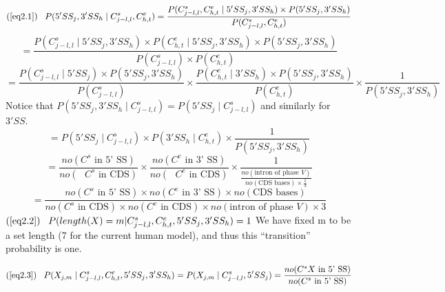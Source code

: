 $$
(\ref{eq2.1}) \;\;\; P(5'SS_j,3'SS_h \; |\;  C^s_{j-l,l},C^e_{h,t})
= \frac{P(C^s_{j-l,l},C^e_{h,t} \; |\;  5'SS_j,3'SS_h ) \times
P( 5'SS_j,3'SS_h)}{ P(C^s_{j-l,l},C^e_{h,t})}
$$
$$
= \frac{P(C^s_{j-l,l} \; |\;  5'SS_j,3'SS_h ) \times P(C^e_{h,t}\; |\; 5'SS_j,3'SS_h )\times P( 5'SS_j,3'SS_h)}
{ P(C^s_{j-l,l})\times P(C^e_{h,t})}
$$
$$
= \frac{P(C^s_{j-l,l} \; |\;  5'SS_j ) \times P( 5'SS_j,3'SS_h)} {P(C^s_{j-l,l})} \times
 \frac{ P(C^e_{h,t}\; |\; 3'SS_h )\times  P(5'SS_j,3'SS_h)}{P(C^e_{h,t})} \times
\frac{1}{ P(5'SS_j,3'SS_h)}
$$
Notice that $P(5'SS_j,3'SS_h \; |\; C^s_{j-l,l}) = P(5'SS_j \; |\; C^s_{j-l,l})$ and similarly for $3'SS$.
$$
= P( 5'SS_j \; |\;  C^s_{j-l,l}) \times  P(3'SS_h \; |\;  C^e_{h,t}) \times \frac{1}{ P(5'SS_j,3'SS_h)}
$$ 
$$
=
	\frac{no(C^s \mbox{ in 5' SS})}{no(\mbox{ $C^s$ in CDS})}
\times
	\frac{no(C^e \mbox{ in 3' SS})}{no(\mbox{ $C^e$ in CDS})}
\times
	\frac{1}{\frac{no(\mbox{intron of phase $V$})}
		{no(\mbox{CDS bases})\times \frac{1}{3}}}
$$
\begin{equation}\label{intron_existance_term}
=
\frac	{
	no(C^s \mbox{ in 5' SS})\times no(C^e \mbox{ in 3' SS})\times no(\mbox{CDS bases})
	}
	{
	no(\mbox{$C^s$ in CDS})\times no(\mbox{$C^e$ in CDS})\times no(\mbox{intron of phase $V$})\times 3
	}
\end{equation}
$
(\ref{eq2.2}) \;\;\; P(length(X) = m | C^s_{j-l,l},C^e_{h,t},5'SS_j,3'SS_h) = 1
$
We have fixed m to be a set length (7 for the current human model), and thus this ``transition'' probability
is one.

\begin{equation}\label{5'SS_consensus}
(\ref{eq2.3}) \;\;\; P(X_{j,m} \; |\; C^s_{j-l,l},C^e_{h,t},5'SS_j,3'SS_h) = P(X_{j,m} \; |\; C^s_{j-l,l},5'SS_j) = 
\frac{no(\mbox{$C^sX$ in 5' SS})}{no(\mbox{$C^s$ in 5' SS} )}
\end{equation}

